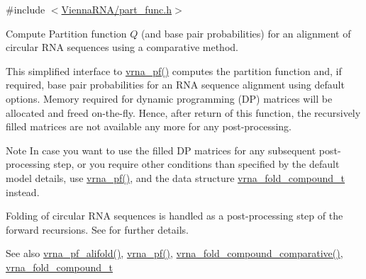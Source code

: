 {\ttfamily \#include $<$\mbox{\hyperlink{part__func_8h}{Vienna\+R\+N\+A/part\+\_\+func.\+h}}$>$}



Compute Partition function $Q$ (and base pair probabilities) for an alignment of circular R\+NA sequences using a comparative method. 

This simplified interface to \mbox{\hyperlink{group__part__func__global_ga29e256d688ad221b78d37f427e0e99bc}{vrna\+\_\+pf()}} computes the partition function and, if required, base pair probabilities for an R\+NA sequence alignment using default options. Memory required for dynamic programming (DP) matrices will be allocated and free\textquotesingle{}d on-\/the-\/fly. Hence, after return of this function, the recursively filled matrices are not available any more for any post-\/processing.

\begin{DoxyNote}{Note}
In case you want to use the filled DP matrices for any subsequent post-\/processing step, or you require other conditions than specified by the default model details, use \mbox{\hyperlink{group__part__func__global_ga29e256d688ad221b78d37f427e0e99bc}{vrna\+\_\+pf()}}, and the data structure \mbox{\hyperlink{group__fold__compound_ga1b0cef17fd40466cef5968eaeeff6166}{vrna\+\_\+fold\+\_\+compound\+\_\+t}} instead.
\end{DoxyNote}
Folding of circular R\+NA sequences is handled as a post-\/processing step of the forward recursions. See \cite{hofacker:2006} for further details.

\begin{DoxySeeAlso}{See also}
\mbox{\hyperlink{group__part__func__global_ga374e31a0f326b2c5da5b84e143a63f38}{vrna\+\_\+pf\+\_\+alifold()}}, \mbox{\hyperlink{group__part__func__global_ga29e256d688ad221b78d37f427e0e99bc}{vrna\+\_\+pf()}}, \mbox{\hyperlink{group__fold__compound_gad6bacc816af274922b13d947f708aa0c}{vrna\+\_\+fold\+\_\+compound\+\_\+comparative()}}, \mbox{\hyperlink{group__fold__compound_ga1b0cef17fd40466cef5968eaeeff6166}{vrna\+\_\+fold\+\_\+compound\+\_\+t}}
\end{DoxySeeAlso}

